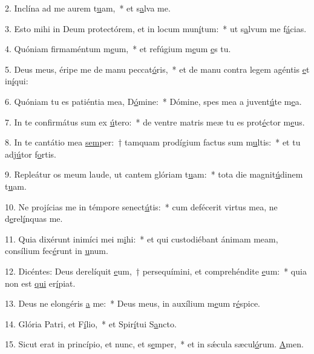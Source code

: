 2. Inclína ad me aurem t\uline{u}am,~* et s\uline{a}lva me.\par 
3. Esto mihi in Deum protectórem, et in locum mun\uline{í}tum:~* ut s\uline{a}lvum me f\uline{á}cias.\par 
4. Quóniam firmaméntum m\uline{e}um,~* et refúgium m\uline{e}um \uline{e}s tu.\par 
5. Deus meus, éripe me de manu peccat\uline{ó}ris,~* et de manu contra legem agéntis \uline{e}t in\uline{í}qui:\par 
6. Quóniam tu es patiéntia mea, D\uline{ó}mine:~* Dómine, spes mea a juvent\uline{ú}te m\uline{e}a.\par 
7. In te confirmátus sum ex \uline{ú}tero:~* de ventre matris meæ tu es prot\uline{é}ctor m\uline{e}us.\par 
8. In te cantátio mea \uline{sem}per:~† tamquam prodígium factus sum m\uline{u}ltis:~* et tu adj\uline{ú}tor f\uline{o}rtis.\par 
9. Repleátur os meum laude, ut cantem glóriam t\uline{u}am:~* tota die magnit\uline{ú}dinem t\uline{u}am.\par 
10. Ne projícias me in témpore senect\uline{ú}tis:~* cum defécerit virtus mea, ne d\uline{e}rel\uline{í}nquas me.\par 
11. Quia dixérunt inimíci mei m\uline{i}hi:~* et qui custodiébant ánimam meam, consílium fec\uline{é}runt in \uline{u}num.\par 
12. Dicéntes: Deus derelíquit \uline{e}um,~† persequímini, et comprehéndite \uline{e}um:~* quia non est \uline{qui} er\uline{í}piat.\par 
13. Deus ne elongéris \uline{a} me:~* Deus meus, in auxílium m\uline{e}um r\uline{é}spice.\par 
14. Glória Patri, et F\uline{í}lio,~* et Spir\uline{í}tui S\uline{a}ncto.\par 
15. Sicut erat in princípio, et nunc, et s\uline{e}mper,~* et in sǽcula sæcul\uline{ó}rum. \uline{A}men.\par 
